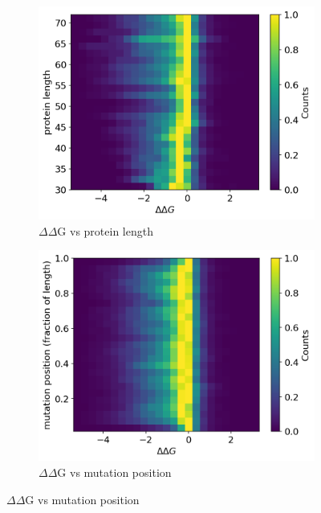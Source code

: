 \documentclass{article}
\begin{document}
\begin{figure}[!htb]
    \centering
    \begin{subfigure}[b]{0.45\textwidth}
        \centering
        \includegraphics[width=\textwidth]{plots/protein_lengths.png}
        \caption{$\Delta\Delta$G vs protein length}
        \label{fig:lengths}
    \end{subfigure}
    \hfill
    \begin{subfigure}[b]{0.45\textwidth}
        \centering
        \includegraphics[width=\textwidth]{plots/mutation_position.png}
        \caption{$\Delta\Delta$G vs mutation position}
        \label{fig:position}
    \end{subfigure}

\end{figure}
\end{document}
